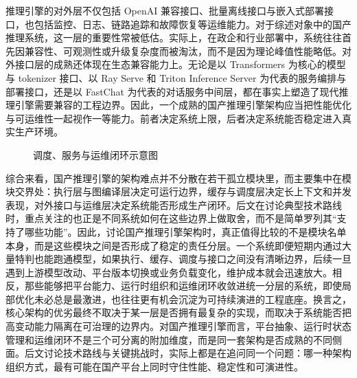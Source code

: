推理引擎的对外层不仅包括 OpenAI 兼容接口、批量离线接口与嵌入式部署接口，也包括监控、日志、链路追踪和故障恢复等运维能力。对于综述对象中的国产推理系统，这一层的重要性常被低估。实际上，在政企和行业部署中，系统往往首先因兼容性、可观测性或升级复杂度而被淘汰，而不是因为理论峰值性能略低。对外接口层的成熟还体现在生态兼容能力上。无论是以 Transformers 为核心的模型与 tokenizer 接口、以 Ray Serve 和 Triton Inference Server 为代表的服务编排与部署接口，还是以 FastChat 为代表的对话服务中间层，都在事实上塑造了现代推理引擎需要兼容的工程边界\citep{transformers,rayserve,tritonserver,fastchat}。因此，一个成熟的国产推理引擎架构应当把性能优化与可运维性一起视作一等能力。前者决定系统上限，后者决定系统能否稳定进入真实生产环境。

\begin{figure}[t]
\centering
\resizebox{0.92\linewidth}{!}{}
\caption{调度、服务与运维闭环示意图}
\label{fig:service-ops-closure}
\end{figure}

综合来看，国产推理引擎的架构难点并不分散在若干孤立模块里，而主要集中在模块交界处：执行层与图编译层决定可运行边界，缓存与调度层决定长上下文和并发表现，对外接口与运维层决定系统能否形成生产闭环。后文在讨论典型技术路线时，重点关注的也正是不同系统如何在这些边界上做取舍，而不是简单罗列其“支持了哪些功能”。因此，讨论国产推理引擎架构时，真正值得比较的不是模块名单本身，而是这些模块之间是否形成了稳定的责任分层。一个系统即便短期内通过大量特判也能跑通模型，如果执行、缓存、调度与接口之间没有清晰边界，后续一旦遇到上游模型改动、平台版本切换或业务负载变化，维护成本就会迅速放大。相反，那些能够把平台能力、运行时组织和运维闭环收敛进统一分层的系统，即使局部优化未必总是最激进，也往往更有机会沉淀为可持续演进的工程底座。换言之，核心架构的优劣最终不取决于某一层是否拥有最复杂的实现，而取决于系统能否把高变动能力隔离在可治理的边界内。对国产推理引擎而言，平台抽象、运行时状态管理和运维闭环不是三个可分离的附加维度，而是同一套架构是否成熟的不同侧面。后文讨论技术路线与关键挑战时，实际上都是在追问同一个问题：哪一种架构组织方式，最有可能在国产平台上同时守住性能、稳定性和可演进性。
